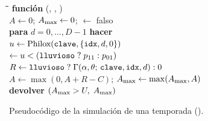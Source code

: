\begin{figure}[!t]
\centering
\begin{minipage}{0.95\columnwidth}
\small
\begin{tabbing}
\hspace*{1em}\=\hspace*{1em}\=\hspace*{1em}\=\kill
\textbf{función} (, , )\\
\> $A \gets 0$;\; $A_{\max} \gets 0$;\;  $\gets$ falso\\
\> \textbf{para} $d = 0,\dots,D-1$ \textbf{hacer}\\
\>\> $u \gets \text{Philox}(\texttt{clave}, \{\texttt{idx}, d, 0\})$\\
\>\>  $\gets u < (\texttt{lluvioso}\; ?\; p_{11} : p_{01})$\\
\>\> $R \gets \texttt{lluvioso}\; ?\; \Gamma(\alpha,\theta;\, \texttt{clave}, \texttt{idx}, d) : 0$\\
\>\> $A \gets \max(0, A + R - C)$;\; $A_{\max} \gets \max(A_{\max}, A)$\\
\> \textbf{devolver} $(A_{\max} > U,\; A_{\max})$
\end{tabbing}
\end{minipage}
\caption{Pseudocódigo de la simulación de una temporada ().}
\label{alg:escenario}
\end{figure}
